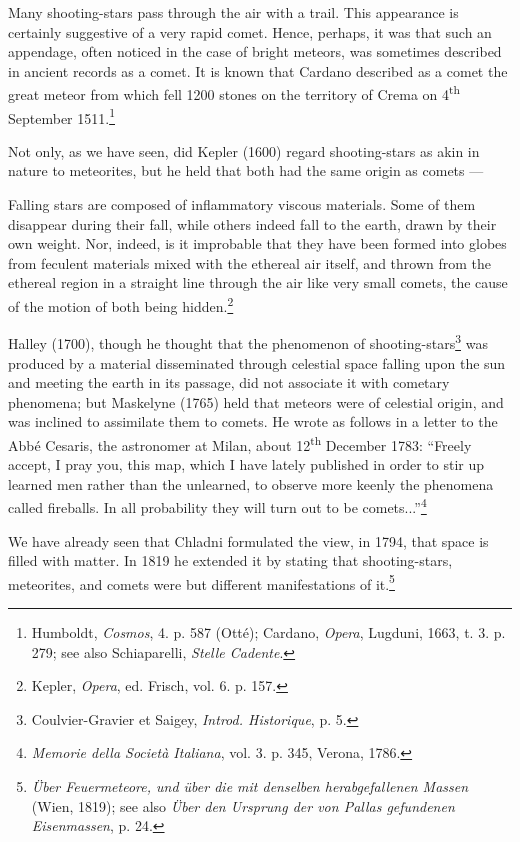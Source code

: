 \documentclass[a4paper, 12pt, oneside, polutonikogreek, english]{article}
\begin{document}
Many shooting-stars pass through the air with a trail. This appearance is certainly suggestive of a very rapid comet. Hence, perhaps, it was that such an appendage, often noticed in the case of bright meteors, was sometimes described in ancient records as a comet. It is known that Cardano described as a comet the great meteor from which fell 1200 stones on the territory of Crema on 4\textsuperscript{th} September 1511.\footnote{Humboldt, \emph{Cosmos}, 4. p. 587 (Otté); Cardano, \emph{Opera}, Lugduni, 1663, t. 3. p. 279; see also Schiaparelli, \emph{Stelle Cadente}.}

Not only, as we have seen, did Kepler (1600) regard shooting-stars as akin in nature to meteorites, but he held that both had the same origin as comets ---

Falling stars are composed of inflammatory viscous materials. Some of them disappear during their fall, while others indeed fall to the earth, drawn by their own weight. Nor, indeed, is it improbable that they have been formed into globes from feculent materials mixed with the ethereal air itself, and thrown from the ethereal region in a straight line through the air like very small comets, the cause of the motion of both being hidden.\footnote{Kepler, \emph{Opera}, ed. Frisch, vol. 6. p. 157.}

Halley (1700), though he thought that the phenomenon of shooting-stars\footnote{Coulvier-Gravier et Saigey, \emph{Introd. Historique}, p. 5.} was produced by a material disseminated through celestial space falling upon the sun and meeting the earth in its passage, did not associate it with cometary phenomena; but Maskelyne (1765) held that meteors were of celestial origin, and was inclined to assimilate them to comets. He wrote as follows in a letter to the Abbé Cesaris, the astronomer at Milan, about 12\textsuperscript{th} December 1783: ``Freely accept, I pray you, this map, which I have lately published in order to stir up learned men rather than the unlearned, to observe more keenly the phenomena called fireballs. In all probability they will turn out to be comets...''\footnote{\emph{Memorie della Società Italiana}, vol. 3. p. 345, Verona, 1786.}

We have already seen that Chladni formulated the view, in 1794, that space is filled with matter. In 1819 he extended it by stating that shooting-stars, meteorites, and comets were but different manifestations of it.\footnote{\emph{Über Feuermeteore, und über die mit denselben herabgefallenen Massen} (Wien, 1819); see also \emph{Über den Ursprung der von Pallas gefundenen Eisenmassen}, p. 24.}
\end{document}
